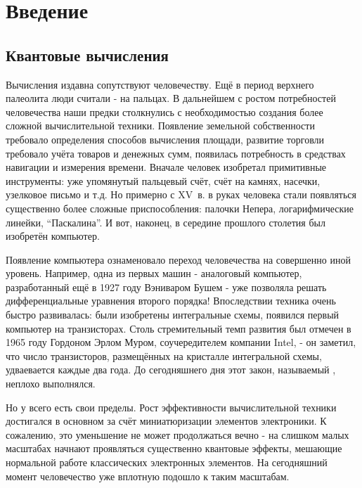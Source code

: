 \documentclass[12pt]{article}
\begin{document}
    \tableofcontents

    \section{Введение}

    \subsection{Квантовые вычисления}
    Вычисления издавна сопутствуют человечеству. Ещё в период верхнего
    палеолита люди считали - на пальцах. В дальнейшем с ростом потребностей
    человечества наши предки столкнулись с необходимостью создания
    более сложной вычислительной техники. Появление земельной собственности
    требовало определения способов вычисления площади, развитие торговли
    требовало учёта товаров и денежных сумм, появилась потребность в
    средствах навигации и измерения времени. Вначале человек изобретал
    примитивные инструменты: уже упомянутый пальцевый счёт, счёт на камнях,
    насечки, узелковое письмо и т.д. Но примерно с \mbox{XV в.} в руках человека
    стали появляться существенно более сложные приспособления: палочки Непера,
    логарифмические линейки, \enquote{Паскалина}. И вот, наконец, в середине
    прошлого столетия был изобретён компьютер.

    Появление компьютера ознаменовало переход человечества на совершенно
    иной уровень. Например, одна из первых машин - аналоговый компьютер,
    разработанный ещё в 1927 году Вэниваром Бушем - уже позволяла решать
    дифференциальные уравнения второго порядка! Впоследствии техника очень
    быстро развивалась: были изобретены интегральные схемы, появился первый
    компьютер на транзисторах. Столь стремительный темп развития был отмечен
    в 1965 году Гордоном Эрлом Муром, соучередителем компании Intel, - он
    заметил, что число транзисторов, размещённых на кристалле
    интегральной схемы, удваевается каждые два года. До сегодняшнего дня
    этот закон, называемый \textit{}, неплохо
    выполнялся.

    Но у всего есть свои пределы. Рост эффективности вычислительной техники
    достигался в основном за счёт миниатюризации элементов электроники.
    К сожалению, это уменьшение не может продолжаться вечно - на слишком малых
    масштабах начнают проявляться существенно квантовые эффекты, мешающие
    нормальной работе классических электронных элементов. На сегодняшний
    момент человечество уже вплотную подошло к таким масштабам.
\end{document}
